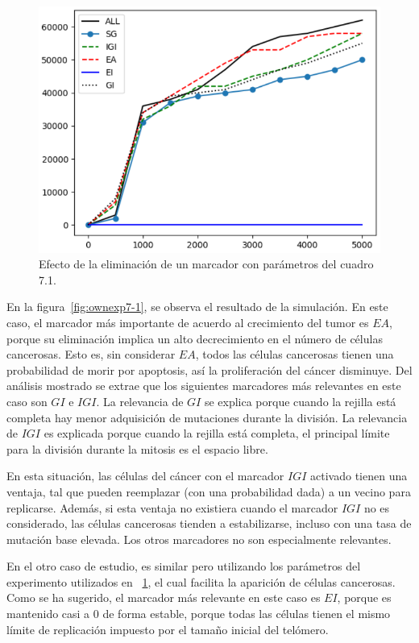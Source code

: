 \begin{figure}[h]
\centering
\includegraphics[scale=0.6]{figures/experiments/exp7/exp7-2}
\caption{Efecto de la eliminación de un marcador con parámetros del cuadro 7.1.}
\label{fig:ownexp7-2}
\end{figure}

En la figura~\ref{fig:ownexp7-1}, se observa el resultado de la simulación. En este caso, el marcador
más importante de acuerdo al crecimiento del tumor es $EA$,
porque su eliminación implica un alto decrecimiento en el número de células cancerosas.
Esto es, sin considerar $EA$, todos las células cancerosas tienen una probabilidad de morir
por apoptosis, así la proliferación del cáncer disminuye. Del análisis mostrado se extrae
que los siguientes marcadores más relevantes en este caso son $GI$ e $IGI$. La relevancia de $GI$
se explica porque cuando la rejilla está completa hay menor adquisición de mutaciones durante la división.
La relevancia de $IGI$ es explicada porque cuando la rejilla está completa, el principal
límite para la división durante la mitosis es el espacio libre.

En esta situación,
las células del cáncer con el marcador $IGI$ activado tienen una ventaja,
tal que pueden reemplazar (con una probabilidad dada) a un vecino para replicarse.
Además, si esta ventaja no existiera cuando el marcador $IGI$ no es considerado, las células
cancerosas tienden a estabilizarse, incluso con una tasa de mutación base elevada.
Los otros marcadores no son especialmente relevantes.

En el otro caso de estudio, es similar pero utilizando los parámetros del experimento utilizados en ~\ref{fig:ownexp7-2},
el cual facilita la aparición de células cancerosas. Como se ha sugerido, el marcador más relevante en este caso
es $EI$, porque es mantenido casi a $0$ de forma estable, porque todas las células tienen el mismo límite de replicación
impuesto por el tamaño inicial del telómero.

